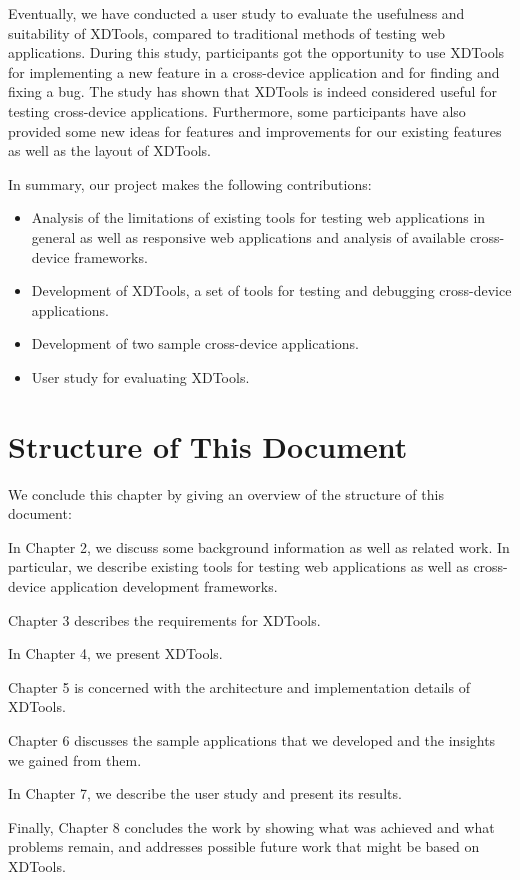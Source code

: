 Eventually, we have conducted a user study to evaluate the usefulness and suitability of XDTools, compared to traditional methods of testing web applications. During this study, participants got the opportunity to use XDTools for implementing a new feature in a cross-device application and for finding and fixing a bug. The study has shown that XDTools is indeed considered useful for testing cross-device applications. Furthermore, some participants have also provided some new ideas for features and improvements for our existing features as well as the layout of XDTools.

In summary, our project makes the following contributions:
\begin{itemize}
	\item Analysis of the limitations of existing tools for testing web applications in general as well as responsive web applications and analysis of available cross-device frameworks.
	\item Development of XDTools, a set of tools for testing and debugging cross-device applications.
	\item Development of two sample cross-device applications.
	\item User study for evaluating XDTools.
\end{itemize}

\section{Structure of This Document}

We conclude this chapter by giving an overview of the structure of this document:

In Chapter 2, we discuss some background information as well as related work. In particular, we describe existing tools for testing web applications as well as cross-device application development frameworks.

Chapter 3 describes the requirements for XDTools.

In Chapter 4, we present XDTools.

Chapter 5 is concerned with the architecture and implementation details of XDTools.

Chapter 6 discusses the sample applications that we developed and the insights we gained from them.

In Chapter 7, we describe the user study and present its results.

Finally, Chapter 8 concludes the work by showing what was achieved and what problems remain, and addresses possible future work that might be based on XDTools.